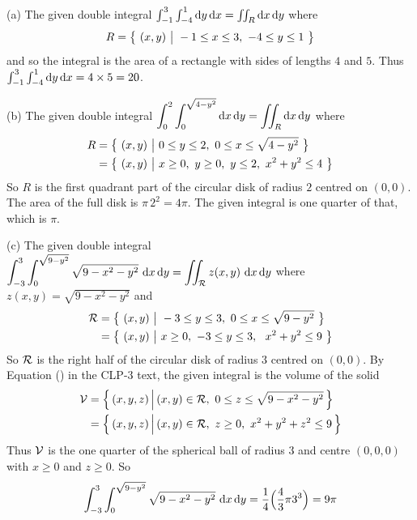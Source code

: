 \begin{solution}
(a) The given double integral
$\int_{-1}^3\int_{-4}^1 \mathrm{d}y\,\mathrm{d}x=\iint_R \mathrm{d}x\,\mathrm{d}y$ 
where
\begin{equation*}
R=\big\{ \ (x,y)\ \big|\  -1\le x\le 3,\ -4\le y\le1\ \big\}
\end{equation*}
and so the integral is the area of a rectangle with sides of lengths 
$4$ and $5$.  Thus $\int_{-1}^3\int_{-4}^1 \mathrm{d}y\,\mathrm{d}x=4\times 5=20$.

(b) The given double integral
$\displaystyle\int_0^2\int_0^{\sqrt{4-y^2}} \mathrm{d}x\,\mathrm{d}y
     =\displaystyle\iint_R \mathrm{d}x\,\mathrm{d}y$ 
where
\begin{align*}
R&=\big\{ \ (x,y)\ \big|\  0\le y\le 2,\ 0\le x\le\sqrt{4-y^2}\ \big\} \\
&=\big\{ \ (x,y)\ \big|\  x\ge 0,\ y\ge 0,\ y\le 2,\ x^2+y^2\le 4\ \big\} 
\end{align*}
So $R$ is the first quadrant part of the circular disk of radius $2$
centred on $(0,0)$. The area of the full disk is $\pi\,2^2=4\pi$. 
The given integral is one quarter of that, which is $\pi$.

(c) The given double integral
$\dst\int_{-3}^3\int_0^{\sqrt{9-y^2}}\sqrt{9-x^2-y^2}\ \dee{x}\,\dee{y}
     =\dst\dblInt_{\cR} z(x,y)\ \dee{x}\,\dee{y}$ 
where $z(x,y)=\sqrt{9-x^2-y^2}$ and
\begin{align*}
\mathcal{R}&=\big\{ \ (x,y)\ \big|\  -3\le y\le 3,\ 0\le x\le\sqrt{9-y^2}\ \big\} \\
&=\big\{ \ (x,y)\ \big|\  x\ge 0,\ -3\le y\le 3,\ \ x^2+y^2\le 9\ \big\} 
\end{align*}
So $\mathcal{R}$ is the right half of the circular disk of radius $3$
centred on $(0,0)$. By Equation () 
in the CLP-3 text, the given integral is the volume of the solid
\begin{align*}
\mathcal{V}&=\Big\{\,(x,y,z)\,\Big|\,(x,y)\in\mathcal{R},\ 0\le z\le \sqrt{9-x^2-y^2}\,\Big\}\\
&=\Big\{\,(x,y,z)\,\Big|\,(x,y)\in\mathcal{R},\ z\ge 0,\ x^2+y^2+z^2\le 9\,\Big\}
\end{align*}
Thus $\mathcal{V}$ is the one quarter of the spherical ball of radius $3$ and 
centre $(0,0,0)$ with $x\ge 0$ and $z\ge 0$. So
\begin{equation*}
\int_{-3}^3\int_0^{\sqrt{9-y^2}}\sqrt{9-x^2-y^2}\ \dee{x}\,\dee{y}
=\frac{1}{4}\Big(\frac{4}{3}\pi 3^3\Big)
=9\pi
\end{equation*} 




\end{solution}


